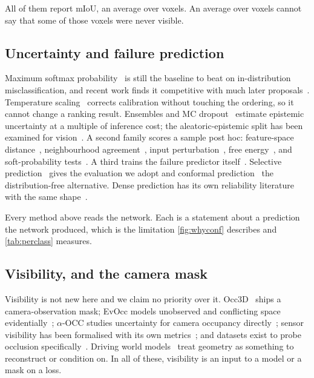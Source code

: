 \documentclass[10pt,twocolumn,letterpaper]{article}
\begin{document}
All of them report mIoU, an average over voxels. An average over voxels
cannot say that some of those voxels were never visible.

\subsection{Uncertainty and failure prediction}
Maximum softmax probability~\cite{hendrycks2017msp} is still the baseline
to beat on in-distribution misclassification, and recent work finds it
competitive with much later proposals~\cite{zhu2024revisiting}. Temperature
scaling~\cite{guo2017calibration} corrects calibration without touching the
ordering, so it cannot change a ranking result. Ensembles and MC
dropout~\cite{lakshminarayanan2017ensembles, gal2016dropout} estimate
epistemic uncertainty at a multiple of inference cost; the
aleatoric-epistemic split has been examined for
vision~\cite{kendall2017uncertainties}. A second family scores a sample
post hoc: feature-space distance~\cite{lee2018mahalanobis}, neighbourhood
agreement~\cite{jiang2018trust}, input perturbation~\cite{liang2018odin},
free energy~\cite{liu2020energy}, and soft-probability
tests~\cite{granese2021doctor}. A third trains the failure predictor
itself~\cite{corbiere2019confidnet, geifman2019selectivenet}. Selective
prediction~\cite{geifman2017selective} gives the evaluation we adopt and
conformal prediction~\cite{angelopoulos2021conformal} the
distribution-free alternative. Dense prediction has its own reliability
literature with the same shape~\cite{derooij2023segreliability,
dreissig2023lidarcalib, blum2019fishyscapes}.

Every method above reads the network. Each is a statement about a
prediction the network produced, which is the limitation
\cref{fig:whyconf} describes and \cref{tab:perclass} measures.

\subsection{Visibility, and the camera mask}
Visibility is not new here and we claim no priority over it.
Occ3D~\cite{tian2023occ3d} ships a camera-observation mask; EvOcc models
unobserved and conflicting space evidentially~\cite{kalble2025evocc};
$\alpha$-OCC studies uncertainty for camera occupancy
directly~\cite{occ2024alpha}; sensor visibility has
been formalised with its own metrics~\cite{borger2022sensorvisibility};
and datasets exist to probe occlusion
specifically~\cite{occludednuscenes2025}. Driving world
models~\cite{rahimi2026mad, xia2026drivelaw, zhu2026dlwm, tan2026lcdrive}
treat geometry as something to reconstruct or condition on. In all of
these, visibility is an input to a model or a mask on a loss.
\end{document}
